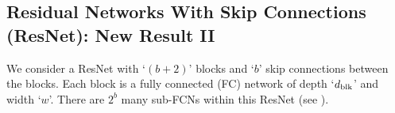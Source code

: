 \subsection{Residual Networks With Skip Connections (ResNet): New Result II}
We consider a ResNet with `$(b+2)$' blocks and `$b$' skip connections between the blocks. Each block is a fully connected (FC) network of depth `$d_{\text{blk}}$' and width `$w$'. There are $2^b$ many sub-FCNs within this ResNet (see ).%


